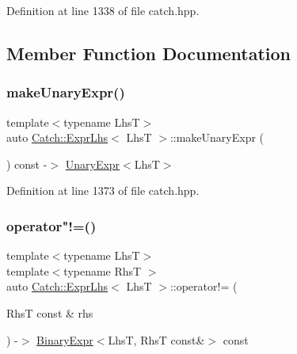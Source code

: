 Definition at line 1338 of file catch.\+hpp.



\subsection{Member Function Documentation}
\mbox{\label{class_catch_1_1_expr_lhs_ab68bd6d5d3ae21b7fba9010150fba95d}} 
\subsubsection{\texorpdfstring{make\+Unary\+Expr()}{makeUnaryExpr()}}
{\footnotesize\ttfamily template$<$typename LhsT$>$ \\
auto \mbox{\hyperlink{class_catch_1_1_expr_lhs}{Catch\+::\+Expr\+Lhs}}$<$ LhsT $>$\+::make\+Unary\+Expr (\begin{DoxyParamCaption}{ }\end{DoxyParamCaption}) const -\/$>$ \mbox{\hyperlink{class_catch_1_1_unary_expr}{Unary\+Expr}}$<$LhsT$>$ \hspace{0.3cm}{\ttfamily [inline]}}



Definition at line 1373 of file catch.\+hpp.

\mbox{\label{class_catch_1_1_expr_lhs_a5e10eab8aed53dd000b89d8fd7754437}} 
\subsubsection{\texorpdfstring{operator"!=()}{operator!=()}\hspace{0.1cm}{\footnotesize\ttfamily [1/2]}}
{\footnotesize\ttfamily template$<$typename LhsT$>$ \\
template$<$typename RhsT $>$ \\
auto \mbox{\hyperlink{class_catch_1_1_expr_lhs}{Catch\+::\+Expr\+Lhs}}$<$ LhsT $>$\+::operator!= (\begin{DoxyParamCaption}\item[{RhsT const \&}]{rhs }\end{DoxyParamCaption}) -\/$>$ \mbox{\hyperlink{class_catch_1_1_binary_expr}{Binary\+Expr}}$<$LhsT, RhsT const\&$>$ const \hspace{0.3cm}{\ttfamily [inline]}}



